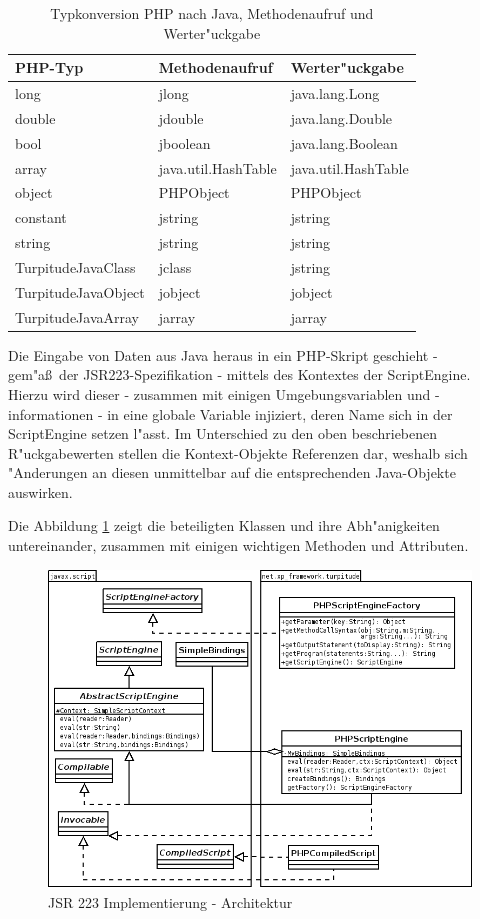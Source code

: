 \begin{table}
\begin{tabular}[tbh]{|l|l|l|}
\hline
PHP-Typ & Methodenaufruf & Werter"uckgabe\\
\hline\hline
long & jlong & java.lang.Long \\
double & jdouble & java.lang.Double \\
bool & jboolean  & java.lang.Boolean \\
array & java.util.HashTable & java.util.HashTable \\
object & PHPObject & PHPObject\\
constant & jstring & jstring\\
string & jstring & jstring \\
TurpitudeJavaClass & jclass & jstring\\
TurpitudeJavaObject & jobject & jobject\\
TurpitudeJavaArray & jarray & jarray\\
\hline
\end{tabular}
\caption{Typkonversion PHP nach Java, Methodenaufruf und Werter"uckgabe}
\end{table}

Die Eingabe von Daten aus Java heraus in ein PHP-Skript geschieht - gem"a\ss\ der JSR223-Spezifikation - mittels des Kontextes der
ScriptEngine. Hierzu wird dieser - zusammen mit einigen Umgebungsvariablen und -informationen - in eine globale Variable injiziert,
deren Name sich in der ScriptEngine setzen l"asst. Im Unterschied zu den oben beschriebenen R"uckgabewerten stellen die Kontext-Objekte
Referenzen dar, weshalb sich "Anderungen an diesen unmittelbar auf die entsprechenden Java-Objekte auswirken.

Die Abbildung \ref{fig:jsr223impl} zeigt die beteiligten Klassen und ihre Abh"anigkeiten untereinander,
zusammen mit einigen wichtigen Methoden und Attributen. 

\begin{figure}[h]
\includegraphics[width=\textwidth]{chap1/img/turpitude.png}
\caption{JSR 223 Implementierung - Architektur}
\label{fig:jsr223impl}
\end{figure}

